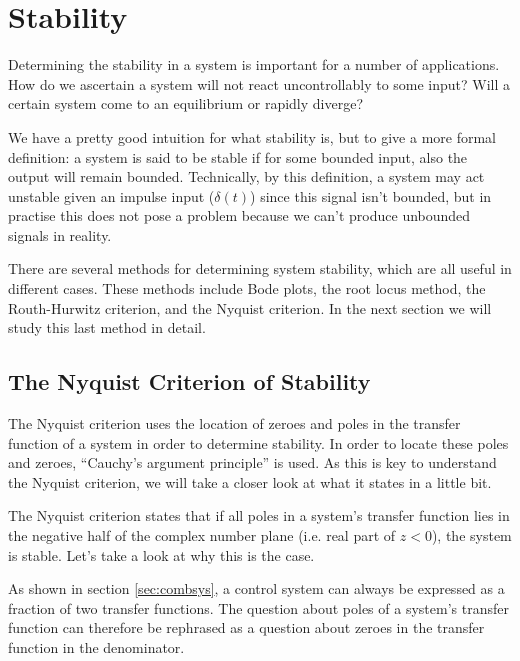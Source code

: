\section{Stability}
Determining the stability in a system is important for a number of applications. How do we ascertain a system will not react uncontrollably to some input? Will a certain system come to an equilibrium or rapidly diverge? 

We have a pretty good intuition for what stability is, but to give a more formal definition: a system is said to be stable if for some bounded input, also the output will remain bounded. Technically, by this definition, a system may act unstable given an impulse input ($\delta(t)$) since this signal isn't bounded, but in practise this does not pose a problem because we can't produce unbounded signals in reality.

There are several methods for determining system stability, which are all useful in different cases. These methods include Bode plots, the root locus method, the Routh-Hurwitz criterion, and the Nyquist criterion. In the next section we will study this last method in detail.

\subsection{The Nyquist Criterion of Stability}
The Nyquist criterion uses the location of zeroes and poles in the transfer function of a system in order to determine stability. In order to locate these poles and zeroes, ``Cauchy's argument principle'' is used. As this is key to understand the Nyquist criterion, we will take a closer look at what it states in a little bit.

The Nyquist criterion states that if all poles in a system's transfer function lies in the negative half of the complex number plane (i.e. real part of $z<0$), the system is stable. Let's take a look at why this is the case.

As shown in section \ref{sec:combsys}, a control system can always be expressed as a fraction of two transfer functions. The question about poles of a system's transfer function can therefore be rephrased as a question about zeroes in the transfer function in the denominator.

